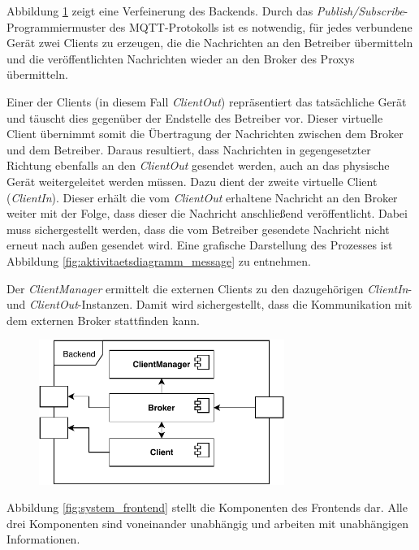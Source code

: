     Abbildung \ref{fig:system_backend} zeigt eine Verfeinerung des Backends. 
    Durch das \emph{Publish/Subscribe}-Programmiermuster des \ac{MQTT}-Protokolls ist es notwendig, für jedes verbundene Gerät zwei Clients zu erzeugen, die die Nachrichten an den Betreiber übermitteln und die veröffentlichten Nachrichten wieder an den Broker des Proxys übermitteln.
    
    Einer der Clients (in diesem Fall \emph{ClientOut}) repräsentiert das tatsächliche Gerät und täuscht dies gegenüber der Endstelle des Betreiber vor. Dieser virtuelle Client übernimmt somit die Übertragung der Nachrichten zwischen dem Broker und dem Betreiber. Daraus resultiert, dass Nachrichten in gegengesetzter Richtung ebenfalls an den \emph{ClientOut} gesendet werden, auch an das physische Gerät weitergeleitet werden müssen. Dazu dient der zweite virtuelle Client (\emph{ClientIn}). Dieser erhält die vom \emph{ClientOut} erhaltene Nachricht an den Broker weiter mit der Folge, dass dieser die Nachricht anschließend veröffentlicht. Dabei muss sichergestellt werden, dass die vom Betreiber gesendete Nachricht nicht erneut nach außen gesendet wird.
    Eine grafische Darstellung des Prozesses ist Abbildung \ref{fig:aktivitaetsdiagramm_message} zu entnehmen.
    
    Der \emph{ClientManager} ermittelt die externen Clients zu den dazugehörigen \emph{ClientIn}- und \emph{ClientOut}-Instanzen. Damit wird sichergestellt, dass die Kommunikation mit dem externen Broker stattfinden kann.
    \begin{figure}[h]%
        \centering
        \includegraphics[width=8cm]{tex/bilder/4_konzept/Systemdiagramm_Konzept_Backend.pdf}
        \label{fig:system_backend}
    \end{figure}
    
    Abbildung \ref{fig:system_frontend} stellt die Komponenten des Frontends dar. Alle drei Komponenten sind voneinander unabhängig und arbeiten mit unabhängigen Informationen.
    
